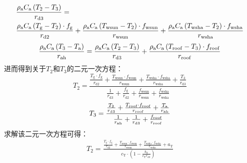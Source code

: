 \begin{equation}
  \begin{split}
    & \frac{\rho _{\rm a} C_{\mathrm a} \left( T_{2} - T_{3} \right)}{r_{\mathrm{d3}}} = \\
    & \frac{\rho _{\rm a} C_{\mathrm a} \left( T_{\mathrm{g}} - T_{2} \right) \cdot f_{\mathrm{g}}}{r_{\mathrm{d2}}} + \frac{\rho _{\rm a} C_{\mathrm a} \left( T_{\mathrm{wsun}} - T_{2} \right) \cdot f_{\mathrm{wsun}}}{r_{\mathrm{wsun}}} + \frac{\rho _{\rm a} C_{\mathrm a} \left( T_{\mathrm{wsha}} - T_{2} \right) \cdot f_{\mathrm{wsha}}}{r_{\mathrm{wsha}}}
  \end{split}
\end{equation}
%
\begin{equation}
  \begin{split}
    \frac{\rho _{\rm a} C_{\mathrm a} \left( T_{3} - T_{\rm a} \right)}{r_{\mathrm{ah}}} =
    \frac{\rho _{\rm a} C_{\mathrm a} \left( T_{2} - T_{3} \right)}{r_{\mathrm{d3}}} + \frac{\rho _{\rm a} C_{\mathrm a} \left( T_{\mathrm{roof}} - T_{3} \right)\cdot f_{\mathrm{roof}}}{r_{\mathrm{roof}}}
  \end{split}
\end{equation}
进而得到关于$T_{2}$和$T_{3}$的二元一次方程：
\begin{equation}
  T_{2} =
  \frac{\frac{T_{\mathrm{g}} \cdot f_{\mathrm{g}}}{r_{\mathrm{d2}}} + \frac{T_{\mathrm{wsun}} \cdot f_{\mathrm{wsun}}}{r_{\mathrm{wsun}}} + \frac{T_{\mathrm{wsha}} \cdot f_{\mathrm{wsha}}}{r_{\mathrm{wsha}}} + \frac{T_{3}}{r_{\mathrm{d3}}}}{\frac{1}{r_{\mathrm{d3}}} + \frac{f_{\mathrm{g}}}{r_{\mathrm{d2}}} + \frac{f_{\mathrm{wsun}}}{r_{\mathrm{wsun}}} + \frac{f_{\mathrm{wsha}}}{r_{\mathrm{wsha}}}}
\end{equation}
%
\begin{equation}\label{result_noveg_T_layer2}
  T_{3} = \frac{\frac{T_{2}}{r_{\mathrm{d3}}} + \frac{T_{\mathrm{roof}} \cdot f_{\mathrm{roof}}}{r_{\mathrm{roof}}} + \frac{T_{\rm a}}{r_{\mathrm{ah}}}}{\frac{1}{r_{\mathrm{ah}}} + \frac{1}{r_{\mathrm{d3}}} + \frac{f_{\mathrm{roof}}}{r_{\mathrm{roof}}}}
\end{equation}
求解该二元一次方程可得：
\begin{equation}
  \begin{split}
    T_{2} =
    \frac{\frac{T_{\mathrm{g}} \cdot f_{\mathrm{g}}}{r_{\mathrm{d2}}} + \frac{T_{\mathrm{wsun}} \cdot f_{\mathrm{wsun}}}{r_{\mathrm{wsun}}} + \frac{T_{\mathrm{wsha}} \cdot f_{\mathrm{wsha}}}{r_{\mathrm{wsha}}} + a_{\mathrm{T}}}{c_{\mathrm{T}} \cdot \left( 1 - \frac{b_{\mathrm {T}} }{c_{\mathrm{T}} r_{\mathrm{d3}}} \right)}
  \end{split}
\end{equation}
